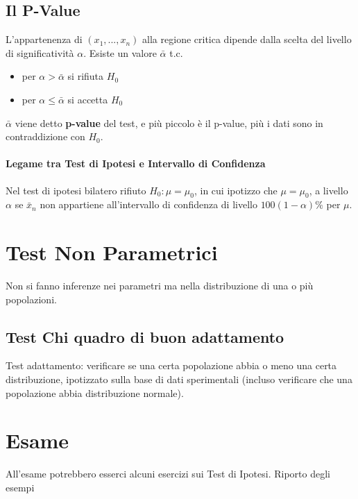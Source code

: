 \subsection{Il P-Value}
L'appartenenza di $(x_1, ..., x_n)$ alla regione critica dipende dalla scelta del livello di significatività $\alpha$.
Esiste un valore $\bar{\alpha}$ t.c.
\begin{itemize}
    \item per $\alpha > \bar{\alpha}$ si rifiuta $H_0$
    \item per $\alpha \leq \bar{\alpha}$ si accetta $H_0$
\end{itemize}
$\bar{\alpha}$ viene detto \textbf{p-value} del test, e più piccolo è il p-value, più i dati sono in contraddizione con $H_0$.
\paragraph*{Legame tra Test di Ipotesi e Intervallo di Confidenza}
Nel test di ipotesi bilatero rifiuto $H_0: \mu=\mu_0$, in cui ipotizzo che $\mu=\mu_0$, a livello $\alpha$ se $\bar{x}_n$ non
appartiene all'intervallo di confidenza di livello $100(1-\alpha)\%$ per $\mu$.


\section*{Test Non Parametrici} Non si fanno inferenze nei parametri ma nella
distribuzione di una o più popolazioni.
\subsection{Test Chi quadro di buon adattamento}
Test adattamento: verificare se una certa popolazione abbia o meno una certa distribuzione,
ipotizzato sulla base di dati sperimentali (incluso verificare che una popolazione
abbia distribuzione normale).



\section{Esame}
All'esame potrebbero esserci alcuni esercizi sui Test di Ipotesi. Riporto degli esempi

